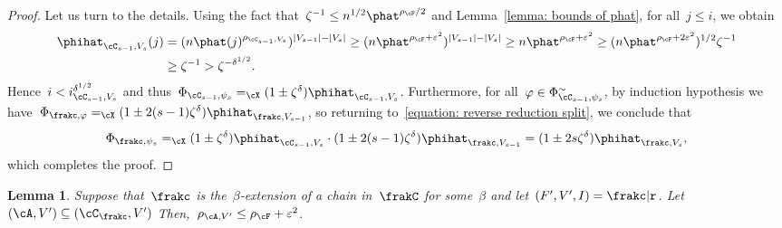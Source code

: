 \documentclass[11pt]{amsart}
\newcommand{\eps}{\varepsilon}
\DeclarePairedDelimiter{\abs}{\lvert}{\rvert}
\newcommand{\Xeq}{=_{\cX}}
\def\phi{\varphi}
\newcommand{\R}{\text{\normalfont\ttfamily r}}
\newtheorem{lemma}[algocf]{Lemma}
\theoremstyle{definition}
\numberwithin{equation}{section}
\begin{document}
\begin{proof}
		Let us turn to the details.
		Using the fact that~$\zeta^{-1}\leq n^{1/2}\phat^{\rho_\cF/2}$ and Lemma~\ref{lemma: bounds of phat}, for all~$j\leq i$, we obtain
		\begin{equation*}
			\begin{aligned}
				\phihat_{\cC_{s-1},V_s}(j)
				&=(n\phat(j)^{\rho_{\cC_{s-1},V_s}})^{\abs{V_{s-1}}-\abs{V_s}}
				\geq (n\phat^{\rho_{\cF}+\eps^2})^{\abs{V_{s-1}}-\abs{V_s}}
				\geq n\phat^{\rho_{\cF}+\eps^2}
				\geq (n\phat^{\rho_{\cF}+2\eps^2})^{1/2}\zeta^{-1}\\
				&\geq \zeta^{-1}
				> \zeta^{-\delta^{1/2}}.
			\end{aligned}
		\end{equation*}
		Hence~$i< i_{\cC_{s-1},V_s}^{\delta^{1/2}}$ and thus~$\Phi_{\cC_{s-1},\psi_s}\Xeq (1\pm \zeta^\delta)\phihat_{\cC_{s-1},V_s}$.
		Furthermore, for all~$\phi\in\Phi^\sim_{\cC_{s-1},\psi_s}$, by induction hypothesis we have~$\Phi_{\frakc,\phi}\Xeq (1\pm 2(s-1)\zeta^\delta)\phihat_{\frakc,V_{s-1}}$, so returning to~\eqref{equation: reverse reduction split}, we conclude that
		\begin{equation*}
			\Phi_{\frakc,\psi_s}
			\Xeq (1\pm \zeta^\delta)\phihat_{\cC_{s-1},V_s}\cdot (1\pm 2(s-1)\zeta^\delta)\phihat_{\frakc,V_{s-1}}
			=(1\pm 2s\zeta^\delta)\phihat_{\frakc,V_{s}},
		\end{equation*}
		which completes the proof.
	\end{proof}
	
	
	\begin{lemma}\label{lemma: partial reverse reduction density}
		Suppose that~$\frakc$ is the~$\beta$-extension of a chain in~$\frakC$ for some~$\beta$ and let~$(F',V',I)=\frakc|\R$.
		Let~$(\cA,V')\subseteq (\cC_\frakc,V')$
		Then,~$\rho_{\cA,V'}\leq \rho_\cF+\eps^2$.
	\end{lemma}
	
\end{document}
